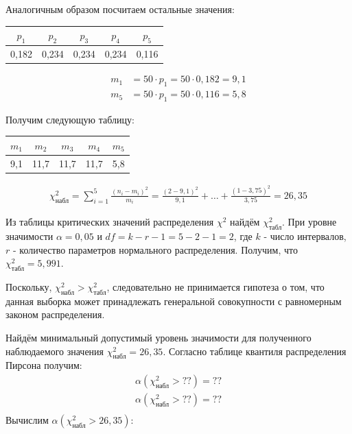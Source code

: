 \documentclass[utf8, a4paper, 14pt, russian, oneside]{book}
\begin{document}
Аналогичным образом посчитаем остальные значения:
\begin{table}[h!]
    \centering
    \begin{tabular}{|c|c|c|c|c|}
        \hline
        $p_1$ & $p_2$ &$p_3$ &$p_4$ &$p_5$ \\
        \hline
        0,182 & 0,234 & 0,234 & 0,234 & 0,116 \\
        \hline
    \end{tabular}
\end{table}
\begin{align*}
    m_1 &= 50 \cdot p_1 = 50 \cdot 0,182 = 9,1 \\
    m_5 &= 50 \cdot p_1 = 50 \cdot 0,116 = 5,8
\end{align*}

Получим следующую таблицу:
\begin{table}[h!]
    \centering
    \begin{tabular}{|c|c|c|c|c|}
        \hline
        $m_1$ & $m_2$ &$m_3$ &$m_4$ &$m_5$ \\
        \hline
        9,1 & 11,7 & 11,7 & 11,7 & 5,8 \\
        \hline
    \end{tabular}
\end{table}
\begin{align*}
    \chi^2_{\text{набл}} = \sum\limits_{i=1}^{5} \frac{(n_i - m_i)^2}{m_i} = \frac{(2 - 9,1)^2}{9,1} + \dots + \frac{(1 - 3,75)^2}{3,75} = 26,35
\end{align*}

Из таблицы критических значений распределения $\chi^2$ найдём $\chi^2_{\text{табл}}$. При уровне значимости $\alpha = 0,05$ и $df = k - r - 1 = 5 - 2 - 1 = 2$,
где $k$ - число интервалов, $r$ - количество параметров нормального распределения. Получим, что $\chi^2_{\text{табл}} = 5,991$.

Поскольку, $\chi^2_{\text{набл}} > \chi^2_{\text{табл}}$, следовательно не принимается гипотеза о том, что данная выборка может принадлежать генеральной совокупности
с равномерным законом распределения.

Найдём минимальный допустимый уровень значимости для полученного наблюдаемого значения $\chi^2_{\text{набл}} = 26,35$. Согласно таблице квантиля
распределения Пирсона получим:
\begin{align*}
    \alpha(\chi^2_{\text{набл}} > ??) = ?? \\
    \alpha(\chi^2_{\text{набл}} > ??) = ?? \\
\end{align*}
Вычислим $\alpha(\chi^2_{\text{набл}} > 26,35)$:
\end{document}
